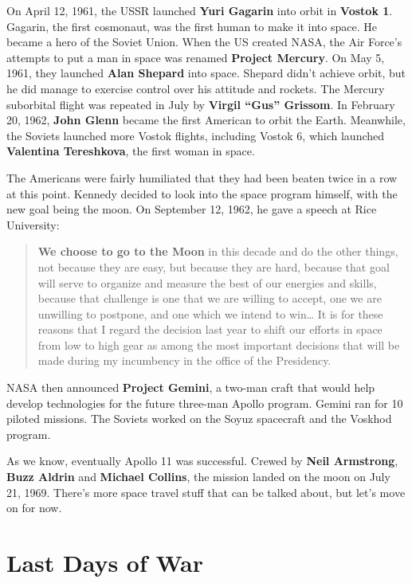 On April 12, 1961, the USSR launched \textbf{Yuri Gagarin} into orbit in \textbf{Vostok 1}.
Gagarin, the first cosmonaut, was the first human to make it into space.
He became a hero of the Soviet Union.
When the US created NASA, the Air Force's attempts to put a man in space was renamed \textbf{Project Mercury}.
On May 5, 1961, they launched \textbf{Alan Shepard} into space.
Shepard didn't achieve orbit, but he did manage to exercise control over his attitude and rockets.
The Mercury suborbital flight was repeated in July by \textbf{Virgil ``Gus'' Grissom}.
In February 20, 1962, \textbf{John Glenn} became the first American to orbit the Earth.
Meanwhile, the Soviets launched more Vostok flights, including Vostok 6,
which launched \textbf{Valentina Tereshkova}, the first woman in space.

The Americans were fairly humiliated that they had been beaten twice in a row at this point.
Kennedy decided to look into the space program himself, with the new goal being the moon.
On September 12, 1962, he gave a speech at Rice University:
\begin{quote}
  \textbf{We choose to go to the Moon} in this decade and do the other things,
  not because they are easy, but because they are hard,
  because that goal will serve to organize and measure the best of our energies and skills,
  because that challenge is one that we are willing to accept,
  one we are unwilling to postpone, and one which we intend to win\dots{}
  It is for these reasons that I regard the decision last year
  to shift our efforts in space from low to high gear
  as among the most important decisions that will be made during my incumbency in the office of the Presidency.
\end{quote}

NASA then announced \textbf{Project Gemini},
a two-man craft that would help develop technologies for the future three-man Apollo program.
Gemini ran for 10 piloted missions.
The Soviets worked on the Soyuz spacecraft and the Voskhod program.

As we know, eventually Apollo 11 was successful.
Crewed by \textbf{Neil Armstrong}, \textbf{Buzz Aldrin} and \textbf{Michael Collins},
the mission landed on the moon on July 21, 1969.
There's more space travel stuff that can be talked about, but let's move on for now.

\section{Last Days of War}

